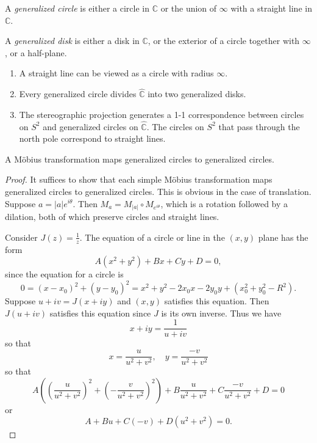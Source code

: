 \begin{defn}
A \emph{generalized circle} is either a circle in
$\mathbb{C}$ or the union of $\infty$ with a
straight line in $\mathbb{C}$.

A \emph{generalized disk} is either a disk in
$\mathbb{C}$, or the exterior of a circle together
with $\infty$, or a half-plane.
\end{defn}

\begin{remark}
  \begin{enumerate}
    \item{
      A straight line can be viewed as a circle with
      radius $\infty$.
    }
    \item{
      Every generalized circle divides $\hat{\mathbb{C}}$
      into two generalized disks.
    }
    \item{
      The stereographic projection generates a 1-1
      correspondence between circles on $S^2$ and generalized
      circles on $\hat{\mathbb{C}}$. The circles on $S^2$ that
      pass through the north pole correspond to straight lines.
    }
  \end{enumerate}
\end{remark}

\begin{theorem}
A M\"obius transformation maps generalized circles to generalized
circles.
\end{theorem}

\begin{proof}
It suffices to show that each simple M\"obius transformation
maps generalized circles to generalized circles. This is obvious
in the case of translation. Suppose $a = |a|e^{i \theta}$. Then
$M_a = M_{|a|} \circ M_{e^{i \theta}}$, which is a rotation followed
by a dilation, both of which preserve circles and straight lines.

Consider $J(z) = \frac{1}{z}$. The equation of a circle or line
in the $(x, y)$ plane has the form
$$
A(x^2 + y^2) + B x + C y + D = 0,
$$
since the equation for a circle is
$$
  0
= (x - x_0)^2 + (y - y_0)^2
= x^2 + y^2 - 2x_0 x - 2 y_0 y + (x_0^2 + y_0^2 - R^2).
$$
Suppose $u + i v = J(x + i y)$ and $(x, y)$ satisfies this equation.
Then $J(u + iv)$ satisfies this equation since $J$ is its own inverse.
Thus we have
$$
  x + iy
= \frac{1}{u + iv}
$$
 so that
$$
  x
= \frac{u}{u^2 + v^2}, \quad
  y
= \frac{-v}{u^2 + v^2}
$$
so that
$$
  A\left(
    \left(
      \frac{u}{u^2 + v^2}
    \right)^2
  + \left(
      -\frac{v}{u^2 + v^2}
    \right)^2
  \right)
+ B \frac{u}{u^2 + v^2}
+ C \frac{-v}{u^2 + v^2}
+ D
= 0
$$
or
$$
A + Bu + C(-v) + D(u^2 + v^2) = 0.
$$
\end{proof}

